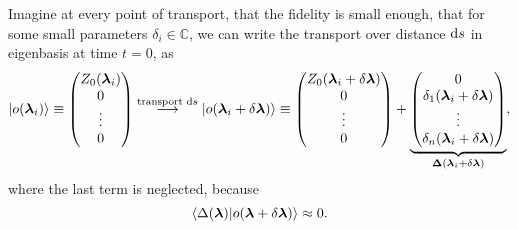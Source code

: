 


Imagine at every point of transport, that the fidelity is small enough, that for some small parameters $\delta_i\in \mathbb{C}$, we can write the transport over distance $\mathrm{d} s$ in eigenbasis at time $t=0$, as
$$\ket{o({\bm\lambda}_i)}\equiv \begin{pmatrix}
    Z_0({\bm\lambda}_i)\\
    0\\
    \vdots \\
    0
\end{pmatrix} \overset{\text{transport }\mathrm{d} s}{\longrightarrow} \ket{o({\bm\lambda}_i+\delta {\bm\lambda})}\equiv\begin{pmatrix}
    Z_0({\bm\lambda}_i+\delta {\bm\lambda})\\
    0\\
    \vdots \\
    0
\end{pmatrix} +\underbrace{\begin{pmatrix}
    0\\
    \delta_1({\bm\lambda}_i+\delta {\bm\lambda})\\
    \vdots \\
    \delta_n({\bm\lambda}_i+\delta {\bm\lambda})
\end{pmatrix}}_{\mathbf{\Delta}({\bm\lambda}_i+\delta {\bm\lambda})}, $$
where the last term is neglected, because
$$\braket{\Delta({\bm\lambda})|o({\bm\lambda}+\delta{\bm\lambda})}\approx 0.$$

